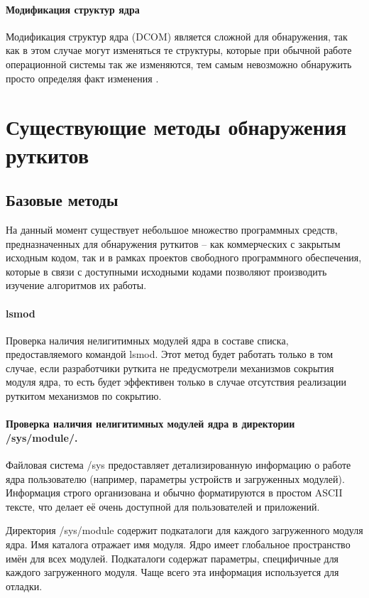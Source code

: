 \documentclass{gost7.32-2001}
\begin{document}
\paragraph{Модификация структур ядра}

Модификация структур ядра (DCOM) является сложной для обнаружения, так
как в этом случае могут изменяться те структуры, которые при обычной
работе операционной системы так же изменяются, тем самым невозможно
обнаружить просто определяя факт изменения .

\newpage
\section{Существующие методы обнаружения руткитов}
\subsection{Базовые методы}
На данный момент существует небольшое множество программных средств,
предназначенных для обнаружения руткитов – как коммерческих с закрытым
исходным кодом, так и в рамках проектов свободного программного
обеспечения, которые в связи с доступными исходными кодами позволяют
производить изучение алгоритмов их работы.

\paragraph{lsmod}
Проверка наличия нелигитимных модулей ядра в составе списка,
предоставляемого командой lsmod. Этот метод будет работать только в
том случае, если разработчики руткита не предусмотрели механизмов
сокрытия модуля ядра, то есть будет эффективен только в случае
отсутствия реализации руткитом механизмов по сокрытию.

\paragraph{Проверка наличия нелигитимных модулей ядра в директории /sys/module/.}

Файловая система /sys предоставляет детализированную информацию о
работе ядра пользователю (например, параметры устройств и загруженных
модулей). Информация строго организована и обычно форматируются в
простом ASCII тексте, что делает её очень доступной для пользователей
и приложений.

Директория /sys/module содержит подкаталоги для каждого загруженного
модуля ядра. Имя каталога отражает имя модуля. Ядро имеет глобальное
пространство имён для всех модулей. Подкаталоги содержат параметры,
специфичные для каждого загруженного модуля. Чаще всего эта информация
используется для отладки.
\end{document}
